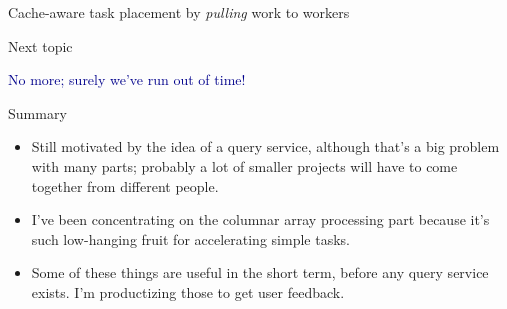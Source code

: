 \documentclass[aspectratio=169]{beamer}
\begin{document}
\begin{frame}{Cache-aware task placement by {\it pulling} work to workers}
\end{frame}

\begin{frame}{Next topic}
\Large
\vspace{1 cm}
\begin{center}
\textcolor{darkblue}{No more; surely we've run out of time!}
\end{center}
\end{frame}

\begin{frame}{Summary}
\large
\vspace{0.5 cm}
\begin{itemize}\setlength{\itemsep}{0.5 cm}
\item Still motivated by the idea of a query service, although that's a big problem with many parts; probably a lot of smaller projects will have to come together from different people.

\item I've been concentrating on the columnar array processing part because it's such low-hanging fruit for accelerating simple tasks.

\item Some of these things are useful in the short term, before any query service exists. I'm productizing those to get user feedback.
\end{itemize}
\end{frame}
\end{document}
